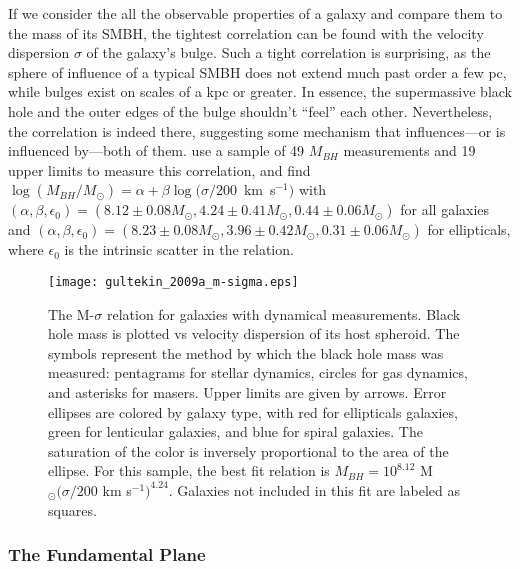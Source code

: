 If we consider the all the observable properties of a galaxy and compare them to the mass of its SMBH, the tightest correlation can be found with the velocity dispersion $\sigma$ of the galaxy's bulge.  Such a tight correlation is surprising, as the sphere of influence of a typical SMBH does not extend much past order a few pc, while bulges exist on scales of a kpc or greater.  In essence, the supermassive black hole and the outer edges of the bulge shouldn't ``feel'' each other.  Nevertheless, the correlation is indeed there, suggesting some mechanism that influences---or is influenced by---both of them.  \citet{gultekin_2009a} use a sample of 49 $M_{BH}$ measurements and 19 upper limits to measure this correlation, and find $\log(M_{BH}/M_{\odot}) = \alpha + \beta \log(\sigma/200$~km~s$^{-1})$ with $(\alpha, \beta, \epsilon_{0}) = (8.12 \pm 0.08 M_{\odot}, 4.24 \pm 0.41 M_{\odot}, 0.44 \pm 0.06 M_{\odot})$ for all galaxies and $(\alpha, \beta, \epsilon_{0}) = (8.23 \pm 0.08 M_{\odot}, 3.96 \pm 0.42 M_{\odot}, 0.31 \pm 0.06 M_{\odot})$ for ellipticals, where $\epsilon_{0}$ is the intrinsic scatter in the relation.

\begin{figure}[tp]
\centering
\texttt{[image: gultekin\_2009a\_m-sigma.eps]}
\caption[The M-$\sigma$ relation for galaxies with dynamical measurements]{\footnotesize The M-$\sigma$ relation for galaxies with dynamical measurements.  Black hole mass is plotted vs velocity dispersion of its host spheroid.  The symbols represent the method by which the black hole mass was measured:  pentagrams for stellar dynamics, circles for gas dynamics, and asterisks for masers.  Upper limits are given by arrows.  Error ellipses are colored by galaxy type, with red for ellipticals galaxies, green for lenticular galaxies, and blue for spiral galaxies.  The saturation of the color is inversely proportional to the area of the ellipse.  For this sample, the best fit relation is $M_{BH} = 10^{8.12}$ M$_{\odot} (\sigma / 200$ km s$^{-1})^{4.24}$.  Galaxies not included in this fit are labeled as squares.  \citep{gultekin_2009a}}
\label{fig:m-sigma}
\end{figure}


\subsubsection{The Fundamental Plane}

